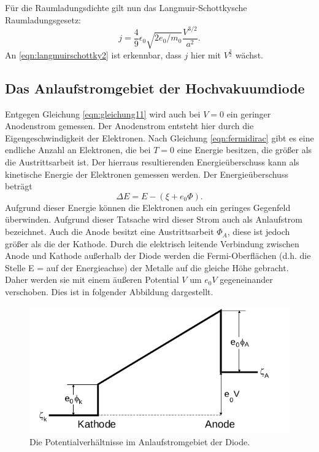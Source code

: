 \noindent
Für die Raumladungsdichte gilt nun das Langmuir-Schottkysche Raumladungsgesetz:
\begin{equation}
  j = \frac{4}{9} \epsilon_0 \sqrt{2 e_0/m_0} \frac{V^{3/2}}{a^2}.
  \label{eqn:langmuirschottky2}
\end{equation}
An \eqref{eqn:langmuirschottky2} ist erkennbar, dass $j$ hier mit
$V^{\frac{3}{2}}$ wächst.

\subsection{Das Anlaufstromgebiet der Hochvakuumdiode}
Entgegen Gleichung \eqref{eqn:gleichung11} wird auch bei $V = 0$ ein
geringer Anodenstrom gemessen. Der Anodenstrom entsteht hier durch die
Eigengeschwindigkeit der Elektronen. Nach Gleichung \eqref{eqn:fermidirac} gibt
es eine endliche Anzahl an Elektronen, die bei $T = 0$ eine Energie besitzen,
die größer als die Austrittsarbeit ist. Der hierraus resultierenden
Energieüberschuss kann als kinetische Energie der Elektronen gemessen werden.
Der Energieüberschuss beträgt
\begin{equation}
  \Delta E = E - (\xi + e_0 \Phi).
  \label{eqn:energieübersch}
\end{equation}
Aufgrund dieser Energie können die Elektronen auch ein geringes Gegenfeld
überwinden. Aufgrund dieser Tatsache wird dieser Strom auch als
Anlaufstrom bezeichnet. Auch die Anode besitzt eine Austrittsarbeit $\Phi_A$, diese ist
jedoch größer als die der Kathode. Durch die elektrisch leitende Verbindung
zwischen Anode und Kathode außerhalb der Diode werden die Fermi-Oberflächen
(d.h. die Stelle E = \xi auf der Energieachse) der Metalle auf die gleiche Höhe
gebracht. Daher werden sie mit einem äußeren Potential $V$ um $e_0 V$
gegeneinander verschoben. Dies ist in folgender Abbildung dargestellt.
\begin{figure}[H]
  \centering
  \includegraphics[scale=0.5]{content/anlaufstrompot.png}
  \caption{Die Potentialverhältnisse im Anlaufstromgebiet der Diode. \cite{AP01}}
  \label{fig:anlaufstrompot}
\end{figure}
